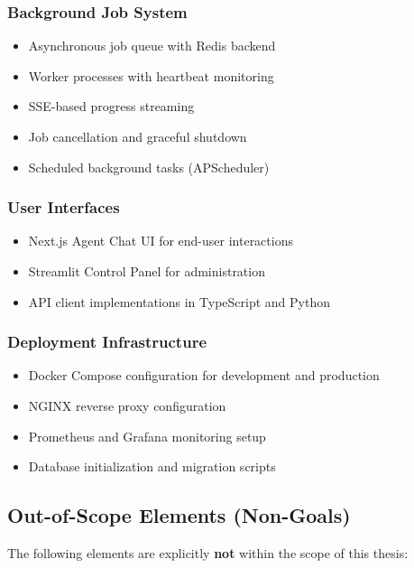 \subsubsection{Background Job System}

\begin{itemize}
    \item Asynchronous job queue with Redis backend
    \item Worker processes with heartbeat monitoring
    \item SSE-based progress streaming
    \item Job cancellation and graceful shutdown
    \item Scheduled background tasks (APScheduler)
\end{itemize}

\subsubsection{User Interfaces}

\begin{itemize}
    \item Next.js Agent Chat UI for end-user interactions
    \item Streamlit Control Panel for administration
    \item API client implementations in TypeScript and Python
\end{itemize}

\subsubsection{Deployment Infrastructure}

\begin{itemize}
    \item Docker Compose configuration for development and production
    \item NGINX reverse proxy configuration
    \item Prometheus and Grafana monitoring setup
    \item Database initialization and migration scripts
\end{itemize}

\subsection{Out-of-Scope Elements (Non-Goals)}

The following elements are explicitly \textbf{not} within the scope of this thesis:

